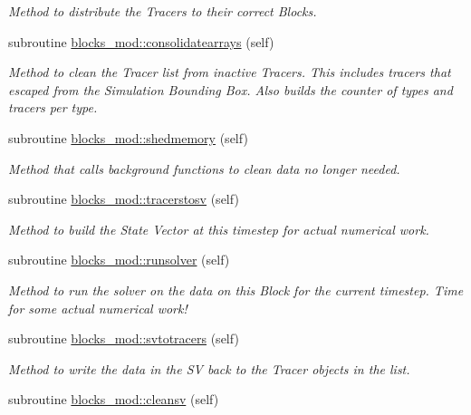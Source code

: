 \begin{DoxyCompactItemize}
\begin{DoxyCompactList}\small\item\em Method to distribute the Tracers to their correct Blocks. \end{DoxyCompactList}\item 
subroutine \mbox{\hyperlink{namespaceblocks__mod_a25ff530b5125e4cee5b1f474b2491883}{blocks\+\_\+mod\+::consolidatearrays}} (self)
\begin{DoxyCompactList}\small\item\em Method to clean the Tracer list from inactive Tracers. This includes tracers that escaped from the Simulation Bounding Box. Also builds the counter of types and tracers per type. \end{DoxyCompactList}\item 
subroutine \mbox{\hyperlink{namespaceblocks__mod_a04a9fab577b0d1fb6cabefcde2b2180d}{blocks\+\_\+mod\+::shedmemory}} (self)
\begin{DoxyCompactList}\small\item\em Method that calls background functions to clean data no longer needed. \end{DoxyCompactList}\item 
subroutine \mbox{\hyperlink{namespaceblocks__mod_aa9c438503e619aa4352081ff46b15430}{blocks\+\_\+mod\+::tracerstosv}} (self)
\begin{DoxyCompactList}\small\item\em Method to build the State Vector at this timestep for actual numerical work. \end{DoxyCompactList}\item 
subroutine \mbox{\hyperlink{namespaceblocks__mod_a3245bdadbec6bb123c517921d1503b48}{blocks\+\_\+mod\+::runsolver}} (self)
\begin{DoxyCompactList}\small\item\em Method to run the solver on the data on this Block for the current timestep. Time for some actual numerical work! \end{DoxyCompactList}\item 
subroutine \mbox{\hyperlink{namespaceblocks__mod_a306a753acc9b8bb9107ebda481162180}{blocks\+\_\+mod\+::svtotracers}} (self)
\begin{DoxyCompactList}\small\item\em Method to write the data in the SV back to the Tracer objects in the list. \end{DoxyCompactList}\item 
subroutine \mbox{\hyperlink{namespaceblocks__mod_ab70bfe5cdce5a717115cfbac04f606a0}{blocks\+\_\+mod\+::cleansv}} (self)

\end{DoxyCompactItemize}
